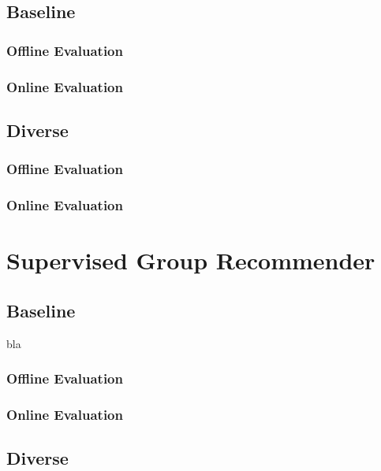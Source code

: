 \subsection{Baseline}

\subsubsection{Offline Evaluation}

\subsubsection{Online Evaluation}

\subsection{Diverse}

\subsubsection{Offline Evaluation}

\subsubsection{Online Evaluation}


\section{Supervised Group Recommender}

\subsection{Baseline}

bla

\subsubsection{Offline Evaluation}

\subsubsection{Online Evaluation}



\subsection{Diverse}

